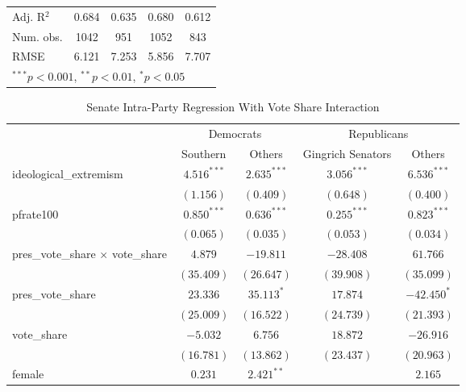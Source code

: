\documentclass[12pt]{article}
\begin{document}
\begin{table}[H]
\begin{center}
\begin{tabular}{l c c c c }
			Adj. R$^2$                    & 0.684         & 0.635         & 0.680          & 0.612          \\
			Num. obs.                     & 1042          & 951           & 1052           & 843            \\
			RMSE                          & 6.121         & 7.253         & 5.856          & 7.707          \\
			\hline
			\multicolumn{5}{l}{\scriptsize{$^{***}p<0.001$, $^{**}p<0.01$, $^*p<0.05$}}
		\end{tabular}
	\end{center}
\end{table}

\begin{table}[H]
	\begin{center}
		\caption{Senate Intra-Party Regression With Vote Share Interaction}
		\begin{tabular}{l c c c c }
			\hline
			& \multicolumn{2}{c}{Democrats} & \multicolumn{2}{c}{Republicans} \\
			\cline{2-5}
			& Southern & Others & Gingrich Senators & Others \\
			\hline
			ideological\_extremism        & $4.516^{***}$ & $2.635^{***}$ & $3.056^{***}$  & $6.536^{***}$ \\
			& $(1.156)$     & $(0.409)$     & $(0.648)$      & $(0.400)$     \\
			pfrate100                     & $0.850^{***}$ & $0.636^{***}$ & $0.255^{***}$  & $0.823^{***}$ \\
			& $(0.065)$     & $(0.035)$     & $(0.053)$      & $(0.034)$     \\
			pres\_vote\_share $ \times $ vote\_share & $4.879$       & $-19.811$     & $-28.408$      & $61.766$      \\
			& $(35.409)$    & $(26.647)$    & $(39.908)$     & $(35.099)$    \\
			pres\_vote\_share             & $23.336$      & $35.113^{*}$  & $17.874$       & $-42.450^{*}$ \\
			& $(25.009)$    & $(16.522)$    & $(24.739)$     & $(21.393)$    \\
			vote\_share                   & $-5.032$      & $6.756$       & $18.872$       & $-26.916$     \\
			& $(16.781)$    & $(13.862)$    & $(23.437)$     & $(20.963)$    \\
			female                        & $0.231$       & $2.421^{**}$  &                & $2.165$       \\

\end{tabular}
\end{center}
\end{table}
\end{document}
